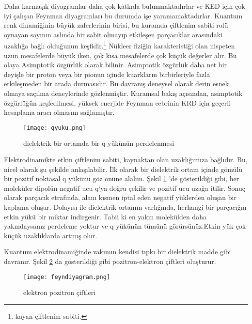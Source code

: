\par Daha karmaşık diyagramlar daha çok katkıda bulunmaktadırlar ve KED için çok iyi çalışan Feynman diyagramları bu durumda işe yaramamaktadırlar. Kuantum renk dinamiğinin büyük zaferlerinin birisi, bu kuramda çiftlenim sabiti rolü oynayan sayının aslında bir sabit olmayıp etkileşen parçacıklar arasındaki uzaklığa bağlı olduğunun keşfidir.\footnote{kayan çiftlenim sabiti.} Nükleer fiziğin karakteristiği olan nispeten uzun mesafelerde büyük iken, çok kısa mesafelerde çok küçük değerler alır. Bu olaya Asimptotik özgürlük olarak bilinir. Asimptotik özgürlük daha net bir deyişle bir proton veya bir pionun içinde kuarkların birbirleriyle fazla etkileşmeden bir arada durmasıdır. Bu davranış deneysel olarak derin esnek olmaya saçılma deneylerinde gözlenmiştir. Kuramsal bakış açısından, asimptotik özgürlüğün keşfedilmesi, yüksek enerjide Feynman cebrinin KRD için geçerli hesaplama aracı olmasını sağlamıştır.

\begin{figure}[!htbp]
\centering
\texttt{[image: qyuku.png]}
\caption{dielektrik bir ortamda bir q yükünün perdelenmesi}
\label{fig:qyuku}
\end{figure}
\par Elektrodinamikte etkin çiftlenim sabiti, kaynaktan olan uzaklığımıza bağlıdır. Bu, nicel olarak şu şekilde anlaşılabilir. İlk olarak bir dielektrik ortam içinde gömülü bir pozitif noktasal q yükünü göz önüne alalım. Şekil \ref{fig:qyuku} 'de gösterildiği gibi, her moleküler dipolün negatif ucu q`ya doğru çekilir ve pozitif ucu uzağa itilir. Sonuç olarak parçacık etrafında, alanı kısmen iptal eden negatif yüklerden oluşan bir kaplama oluşur. Dolayısı ile dielektrik ortamın varlığında, herhangi bir parçacığın etkin yükü bir miktar indirgenir. Tabii ki en yakın molekülden daha yakındaysanız perdeleme yoktur ve q yükünün tümünü görürsünüz.Etkin yük çok küçük uzaklıklarda artmış olur.
\par Kuantum elektrodinamiğinde vakımın kendisi tıpkı bir dielektrik madde gibi davranır. Şekil \ref{fig:feyndiyagram} da gösterildiği gibi pozitron-elektron çiftleri oluşturur.
\begin{figure}[!htbp]
\centering
\texttt{[image: feyndiyagram.png]}
\caption{elektron pozitron çiftleri}
\label{fig:feyndiyagram}
\end{figure}

